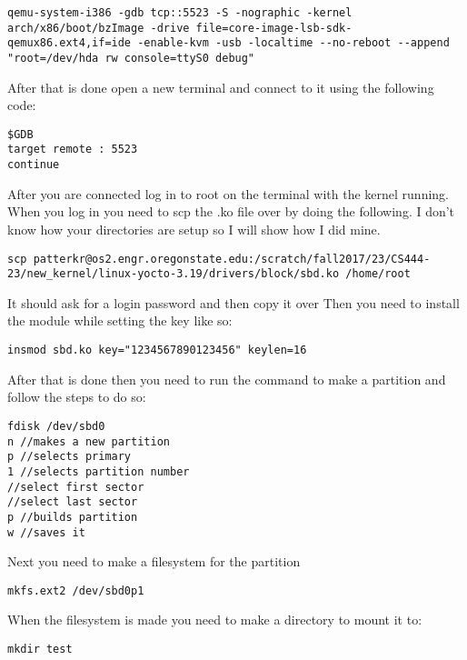 \documentclass[10pt,letterpaper,onecolumn,draftclsnofoot]{IEEEtran}
\begin{document}
\begin{lstlisting}
qemu-system-i386 -gdb tcp::5523 -S -nographic -kernel arch/x86/boot/bzImage -drive file=core-image-lsb-sdk-qemux86.ext4,if=ide -enable-kvm -usb -localtime --no-reboot --append "root=/dev/hda rw console=ttyS0 debug"
\end{lstlisting}

After that is done open a new terminal and connect to it using the following code:

\begin{lstlisting}
$GDB
target remote : 5523
continue
\end{lstlisting}

After you are connected log in to root on the terminal with the kernel running.
When you log in you need to scp the .ko file over by doing the following.
I don't know how your directories are setup so I will show how I did mine.

\begin{lstlisting}
scp patterkr@os2.engr.oregonstate.edu:/scratch/fall2017/23/CS444-23/new_kernel/linux-yocto-3.19/drivers/block/sbd.ko /home/root
\end{lstlisting}

It should ask for a login password and then copy it over
Then you need to install the module while setting the key like so:

\begin{lstlisting}
insmod sbd.ko key="1234567890123456" keylen=16
\end{lstlisting}

After that is done then you need to run the command to make a partition and follow the steps to do so:

\begin{lstlisting}
fdisk /dev/sbd0
n //makes a new partition
p //selects primary
1 //selects partition number
//select first sector
//select last sector
p //builds partition
w //saves it
\end{lstlisting}

Next you need to make a filesystem for the partition

\begin{lstlisting}
mkfs.ext2 /dev/sbd0p1
\end{lstlisting}

When the filesystem is made you need to make a directory to mount it to:

\begin{lstlisting}
mkdir test
\end{lstlisting}
\end{document}

